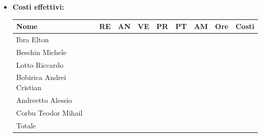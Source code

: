 \begin{itemize}
\begin{longtable}{|c|c|c|c|}
        \hline
        \end{longtable}
    \item \textbf{Costi effettivi:}
    \begin{longtable}{|p{}|c|c|c|c|c|c|c|c|}
        \hline
        Nome & RE & AN & VE & PR & PT & AM & Ore & Costi\\
        \hline
        Ibra \newline Elton & & & & & & & & \\
        \hline
        Beschin Michele & & & & & & & & \\
        \hline
        Lotto \newline Riccardo & & & & & & & & \\
        \hline
        Bobirica Andrei Cristian & & & & & & & & \\
        \hline
        Andreetto Alessio & & & & & & & & \\
        \hline
        Corbu Teodor Mihail & & & & & & & & \\
        \hline
        Totale & & & & & & & & \\
        \hline
    \end{longtable}
    \end{itemize}

